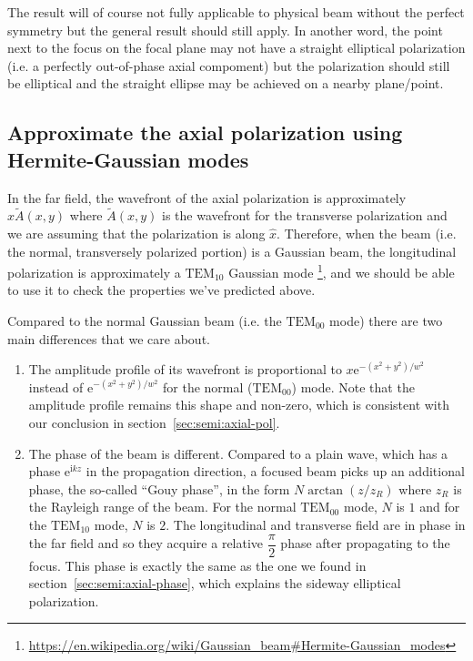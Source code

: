 \documentclass[10pt,fleqn]{article}
\newcommand{\ue}{\mathrm{e}}
\newcommand{\ui}{\mathrm{i}}
\newcommand{\paren}[1]{{\left({#1}\right)}}
\begin{document}
The result will of course not fully applicable to physical beam
without the perfect symmetry but the general result should still apply.
In another word, the point next to the focus on the focal plane may not have
a straight elliptical polarization (i.e. a perfectly out-of-phase axial compoment)
but the polarization should still be elliptical and the straight ellipse
may be achieved on a nearby plane/point.

\subsection{Approximate the axial polarization using Hermite-Gaussian modes}
In the far field, the wavefront of the axial polarization is approximately
$x \tilde A(x, y)$ where $\tilde A(x, y)$ is the wavefront for
the transverse polarization and we are assuming that the polarization is along $\hat x$.
Therefore, when the beam (i.e. the normal, transversely polarized portion)
is a Gaussian beam, the longitudinal polarization is approximately a $\mathrm{TEM}_{10}$
Gaussian mode
\footnote{\url{https://en.wikipedia.org/wiki/Gaussian_beam\#Hermite-Gaussian_modes}},
and we should be able to use it to check the properties we've predicted above.

Compared to the normal Gaussian beam (i.e. the $\mathrm{TEM}_{00}$ mode)
there are two main differences that we care about.
\begin{enumerate}
\item The amplitude profile of its wavefront is proportional to
  $x\ue^{-(x^2+y^2)/w^2}$ instead of $\ue^{-(x^2+y^2)/w^2}$
  for the normal ($\mathrm{TEM}_{00}$) mode.
  Note that the amplitude profile remains this shape and non-zero,
  which is consistent with our conclusion in section~\ref{sec:semi:axial-pol}.
\item The phase of the beam is different. Compared to a plain wave,
  which has a phase $\ue^{\ui kz}$ in the propagation direction,
  a focused beam picks up an additional phase, the so-called ``Gouy phase'',
  in the form $N\arctan\paren{z/z_R}$ where $z_R$ is the Rayleigh range of the beam.
  For the normal $\mathrm{TEM}_{00}$ mode, $N$ is $1$
  and for the $\mathrm{TEM}_{10}$ mode, $N$ is $2$.
  The longitudinal and transverse field are in phase in the far field
  and so they acquire a relative $\dfrac{\pi}{2}$ phase after propagating to the focus.
  This phase is exactly the same as the one we found in
  section~\ref{sec:semi:axial-phase},
  which explains the sideway elliptical polarization.
\end{enumerate}
\end{document}
